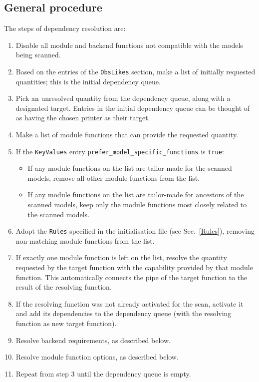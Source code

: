 \documentclass[pdftex,twocolumn,epjc3_preprint,runningheads]{svjour3}
\renewcommand{\_}{\discretionary{\underscore}{}{\underscore}}
\newcommand\yaml[1]{{\lstset{style=yaml}\lstinline!#1!\lstset{style=cpp}}}
\begin{document}
\subsection{General procedure}
\label{depres_general}

The steps of dependency resolution are:

\begin{enumerate}
  \item Disable all module and backend functions not compatible with the models being scanned.
  \item Based on the entries of the \yaml{ObsLikes}
    section, make a list of initially requested quantities; this is the initial dependency queue.
  \item Pick an unresolved quantity from the dependency queue, along with a designated target.
    Entries in the initial dependency queue can be thought of as having the chosen printer as their target.
  \item Make a list of module functions that can provide the requested quantity.
  \item If the \yaml{KeyValues} entry \yaml{prefer_model_specific_functions} is \yaml{true}:\begin{itemize}
    \item If any module functions on the list are tailor-made for the scanned models, remove all other module functions from the list.
    \item If any module functions on the list are tailor-made for ancestors of the scanned models, keep only the module functions most closely related to the scanned models.
  \end{itemize}
  \item Adopt the \yaml{Rules} specified in the initialisation file (see Sec.\ \ref{Rules}), removing non-matching module functions from the list.
  \item If exactly one module function is left on the list, resolve the
    quantity requested by the target function with the capability provided by
    that module function.  This automatically connects the pipe of the
    target function to the result of the resolving function.
  \item If the resolving function was not already activated for the scan,
    activate it and add its dependencies to the dependency queue (with the
    resolving function as new target function).
  \item Resolve backend requirements, as described below.
  \item Resolve module function options, as described below.
  \item Repeat from step 3 until the dependency queue is empty.
\end{enumerate}
\end{document}
